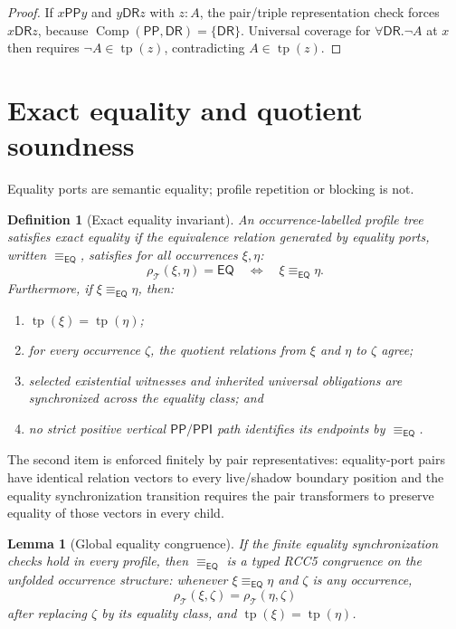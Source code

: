 \documentclass[11pt]{article}
\newtheorem{lemma}[theorem]{Lemma}
\newtheorem{definition}[theorem]{Definition}
\newcommand{\EQ}{\mathsf{EQ}}
\newcommand{\PP}{\mathsf{PP}}
\newcommand{\PPI}{\mathsf{PPI}}
\newcommand{\DR}{\mathsf{DR}}
\newcommand{\Comp}{\operatorname{Comp}}
\newcommand{\tp}{\operatorname{tp}}
\newcommand{\eqE}{\equiv_{\EQ}}
\begin{document}
\begin{proof}
If $x\PP y$ and $y\DR z$ with $z:A$, the pair/triple representation check forces $x\DR z$, because $\Comp(\PP,\DR)=\{\DR\}$.  Universal coverage for $\forall\DR.\neg A$ at $x$ then requires $\neg A\in\tp(z)$, contradicting $A\in\tp(z)$.
\end{proof}

\section{Exact equality and quotient soundness}

Equality ports are semantic equality; profile repetition or blocking is not.

\begin{definition}[Exact equality invariant]
An occurrence-labelled profile tree satisfies exact equality if the equivalence relation generated by equality ports, written $\eqE$, satisfies for all occurrences $\xi,\eta$:
\[
  \rho_\mathcal T(\xi,\eta)=\EQ
  \quad\Longleftrightarrow\quad
  \xi\eqE\eta.
\]
Furthermore, if $\xi\eqE\eta$, then:
\begin{enumerate}[label=(E\arabic*)]
\item $\tp(\xi)=\tp(\eta)$;
\item for every occurrence $\zeta$, the quotient relations from $\xi$ and $\eta$ to $\zeta$ agree;
\item selected existential witnesses and inherited universal obligations are synchronized across the equality class; and
\item no strict positive vertical $\PP/\PPI$ path identifies its endpoints by $\eqE$.
\end{enumerate}
\end{definition}

The second item is enforced finitely by pair representatives: equality-port pairs have identical relation vectors to every live/shadow boundary position and the equality synchronization transition requires the pair transformers to preserve equality of those vectors in every child.

\begin{lemma}[Global equality congruence]
If the finite equality synchronization checks hold in every profile, then $\eqE$ is a typed RCC5 congruence on the unfolded occurrence structure: whenever $\xi\eqE\eta$ and $\zeta$ is any occurrence,
\[
  \rho_\mathcal T(\xi,\zeta)=\rho_\mathcal T(\eta,\zeta)
\]
after replacing $\zeta$ by its equality class, and $\tp(\xi)=\tp(\eta)$.
\end{lemma}
\end{document}
